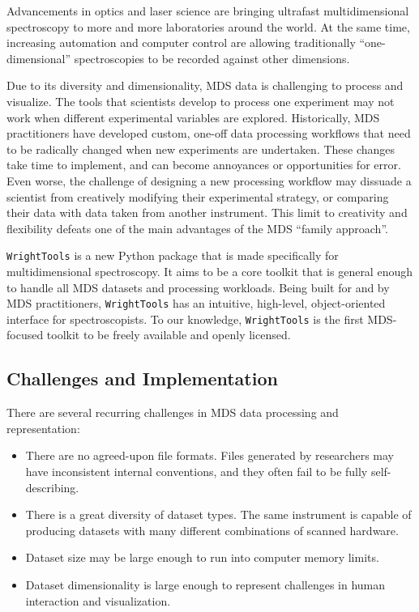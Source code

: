 Advancements in optics and laser science are bringing ultrafast
multidimensional spectroscopy to more and more laboratories around the
world. At the same time, increasing automation and computer control are
allowing traditionally ``one-dimensional'' spectroscopies to be recorded
against other dimensions.

Due to its diversity and dimensionality, MDS data is challenging to
process and visualize. The tools that scientists develop to process one
experiment may not work when different experimental variables are
explored. Historically, MDS practitioners have developed custom, one-off
data processing workflows that need to be radically changed when new
experiments are undertaken. These changes take time to implement, and
can become annoyances or opportunities for error. Even worse, the
challenge of designing a new processing workflow may dissuade a
scientist from creatively modifying their experimental strategy, or
comparing their data with data taken from another instrument. This limit
to creativity and flexibility defeats one of the main advantages of the
MDS ``family approach''.

\texttt{WrightTools} is a new Python package that is made specifically
for multidimensional spectroscopy. It aims to be a core toolkit that is
general enough to handle all MDS datasets and processing workloads.
Being built for and by MDS practitioners, \texttt{WrightTools} has an
intuitive, high-level, object-oriented interface for spectroscopists. To
our knowledge, \texttt{WrightTools} is the first MDS-focused toolkit to
be freely available and openly licensed.

\hypertarget{challenges-and-implementation}{%
\subsection{Challenges and
Implementation}\label{challenges-and-implementation}}

There are several recurring challenges in MDS data processing and
representation:

\begin{itemize}
\item
  There are no agreed-upon file formats. Files generated by researchers
  may have inconsistent internal conventions, and they often fail to be
  fully self-describing.
\item
  There is a great diversity of dataset types. The same instrument is
  capable of producing datasets with many different combinations of
  scanned hardware.
\item
  Dataset size may be large enough to run into computer memory limits.
\item
  Dataset dimensionality is large enough to represent challenges in
  human interaction and visualization.
\end{itemize}

